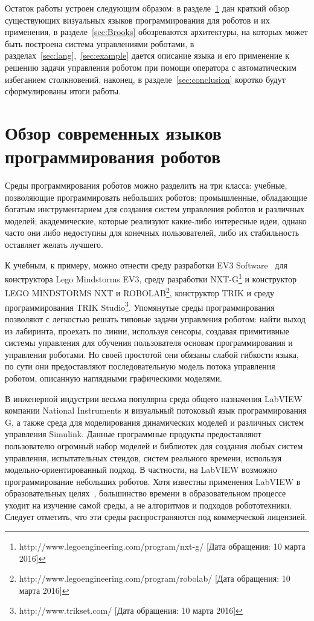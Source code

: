 \documentclass[conference]{IEEEtran}
\begin{document}
Остаток работы устроен следующим образом: в разделе~\ref{sec:Overview} дан краткий обзор существующих визуальных языков программирования для роботов и их применения, в разделе~\ref{sec:Brooks} обозреваются архитектуры, на которых может быть построена система управлениями роботами, в разделах~\ref{sec:lang},~\ref{sec:example} дается описание языка и его применение к решению задачи управления роботом при помощи оператора с автоматическим избеганием столкновений, наконец, в разделе~\ref{sec:conclusion} коротко будут сформулированы итоги работы. 

\section{Обзор современных языков программирования роботов}
\label{sec:Overview}
Среды программирования роботов можно разделить на три класса: учебные, позволяющие программировать небольших роботов; промышленные, обладающие богатым инструментарием для создания систем управления роботов и различных моделей; академические, которые реализуют какие-либо интересные идеи, однако часто они либо недоступны для конечных пользователей, либо их стабильность оставляет желать лучшего. 

К учебным, к примеру, можно отнести среду разработки EV3 Software~\cite{3_rollins} для конструктора Lego Mindstorms EV3, среду разработки NXT-G\footnote{http://www.legoengineering.com/program/nxt-g/ [Дата обращения: 10 марта 2016]} и конструктор LEGO MINDSTORMS NXT и ROBOLAB\footnote{http://www.legoengineering.com/program/robolab/ [Дата обращения: 10 марта 2016]}, конструктор TRIK и среду программирования TRIK Studio\footnote{http://www.trikset.com/ [Дата обращения: 10 марта 2016]}. Упомянутые среды программирования позволяют с легкостью решать типовые задачи управления роботом: найти выход из лабиринта, проехать по линии, используя сенсоры, создавая примитивные системы управления для обучения пользователя основам программирования и управления роботами. Но своей простотой они обязаны слабой гибкости языка, по сути они предоставляют последовательную модель потока управления роботом, описанную наглядными графическими моделями.

В инженерной индустрии весьма популярна среда общего назначения LabVIEW компании National Instruments и визуальный потоковый язык программирования G, а также среда для моделирования динамических моделей и различных систем управления Simulink. Данные программные продукты предоставляют пользователю огромный набор моделей и библиотек для создания любых систем управления, испытательных стендов, систем реального времени, используя модельно-ориентированный подход. В частности, на LabVIEW возможно программирование небольших роботов. Хотя известны применения LabVIEW в образовательных целях~\cite{1_gomez-de-gabriel_mandow_fernandez-lozano_garcia-cerezo_2011}, большинство времени в образовательном процессе уходит на изучение самой среды, а не алгоритмов и подходов робототехники. Следует отметить, что эти среды распространяются под коммерческой лицензией.
\end{document}

